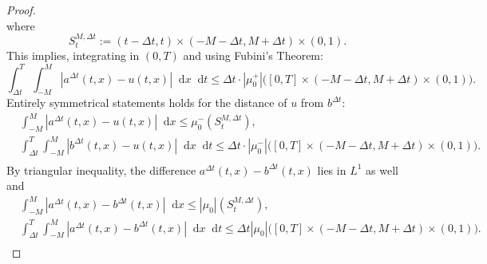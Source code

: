 \documentclass[10pt,a4paper]{amsart}
\newcommand*\dif{\mathop{}\!\mathrm{d}}
\begin{document}
\begin{proof}
\begin{equation}
\end{equation}
where 
$$
S_t^{M, \Delta t}:= (t-\Delta t, t) \times (-M- \Delta t, M + \Delta t) \times (0, 1).
$$
This implies, integrating in $(0, T)$ and using Fubini's Theorem:
\begin{equation}\label{eq:uminusa}
    \int_{\Delta t}^T \int_{-M}^M |a^{\Delta t}(t, x) -u(t, x) | \dif x \dif t \leq \Delta t \cdot |\mu_0^+|\big([0,T] \times (-M-\Delta t, M+\Delta t) \times (0, 1) \big).
\end{equation}
Entirely symmetrical statements holds for the distance of $u$ from $b^{\Delta t}$:
\begin{equation}\label{eq:uminusb}
\begin{aligned}
    &  \int_{-M}^M |a^{\Delta t}(t, x) -u(t, x) | \dif x \leq \mu_0^-(S_t^{M, \Delta t}),\\
    & \int_{\Delta t}^T \int_{-M}^M |b^{\Delta t}(t, x) -u(t, x) | \dif x \dif t \leq \Delta t \cdot |\mu_0^-|\big([0,T] \times (-M-\Delta t, M+\Delta t) \times (0, 1) \big).\\
    \end{aligned}
\end{equation}
By triangular inequality, the difference $a^{\Delta t}(t, x)-b^{\Delta t}(t, x)$ lies in $L^1$ as well and 
\begin{equation}\label{eq:abdifference}
\begin{aligned}
& \int_{-M}^M |a^{\Delta t}(t, x)-b^{\Delta t}(t, x)| \dif x  \leq  |\mu_0|(S_t^{M, \Delta t}),\\
    & \int_{\Delta t}^T \int_{-M}^M |a^{\Delta t}(t, x)-b^{\Delta t}(t, x)| \dif x \dif t \leq \Delta t |\mu_0|\big([0,T] \times (-M-\Delta t, M+\Delta t) \times (0, 1) \big).\\
    \end{aligned}
\end{equation}


\end{proof}
\end{document}
